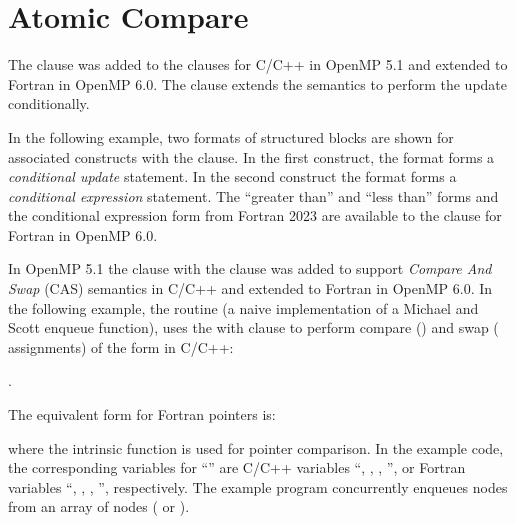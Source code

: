 \section{Atomic Compare}
\label{sec:cas}


The  clause was added to the  clauses
for C/C++ in OpenMP 5.1 and extended to Fortran in OpenMP 6.0.
The  clause extends the semantics to perform the 
update conditionally. 

In the following example, two formats of structured blocks
are shown for associated  constructs with the  clause.
In the first  construct, the format forms a \emph{conditional update} statement.
In the second  construct the format forms a \emph{conditional expression} statement.
The ``greater than'' and ``less than'' forms and 
the conditional expression form from Fortran 2023
are available to the  clause for Fortran in OpenMP 6.0.

\clearpage

In OpenMP 5.1 the  clause with the  clause
was added to support \emph{Compare And Swap} (CAS) semantics 
in C/C++ and extended to Fortran in OpenMP 6.0.
In the following example, the  routine
(a naive implementation of a Michael and Scott enqueue function), uses the
 with  clause to perform compare
() and swap ( assignments) of the
form in C/C++: 
\begin{description}[noitemsep,labelindent=5mm,widest=f90]
\item {}.
\end{description}

The equivalent form for Fortran pointers is:
\begin{description}[noitemsep,labelindent=5mm,widest=f90]
\item {}
\end{description}
where the intrinsic function  is used
for pointer comparison.
In the example code, the corresponding variables for ``''
are C/C++ variables ``, , 
, '', 
or Fortran variables ``, , 
, '', respectively.
The example program concurrently enqueues nodes from an array of nodes
( or ).

